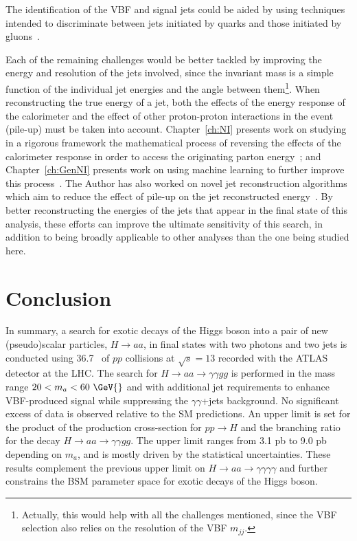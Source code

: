 The identification of the VBF and signal jets could be aided by using techniques intended to discriminate between jets initiated by quarks and those initiated by gluons~\cite{ATL-PHYS-PUB-2017-009,Aad:2014gea,ATLAS-CONF-2016-034,ATL-PHYS-PUB-2017-017}.

Each of the remaining challenges would be better tackled by improving the energy and \pt{} resolution of the jets involved, since the invariant mass is a simple function of the individual jet energies and the angle between them\footnote{Actually, this would help with all the challenges mentioned, since the VBF selection also relies on the resolution of the VBF $m_{jj}$.}.
When reconstructing the true energy of a jet, both the effects of the energy response of the calorimeter and the effect of other proton-proton interactions in the event (pile-up) must be taken into account.
Chapter~\ref{ch:NI} presents work on studying in a rigorous framework the mathematical process of reversing the effects of the calorimeter response in order to access the originating parton energy~\cite{Cukierman:2016dkb};
and Chapter~\ref{ch:GenNI} presents work on using machine learning to further improve this process~\cite{ATL-PHYS-PUB-2018-013}.
The Author has also worked on novel jet reconstruction algorithms which aim to reduce the effect of pile-up on the jet reconstructed energy~\cite{ATLAS-CONF-2017-065}.
By better reconstructing the energies of the jets that appear in the final state of this analysis, these efforts can improve the ultimate sensitivity of this search, in addition to being broadly applicable to other analyses than the one being studied here. 

\FloatBarrier
\section{Conclusion}
\label{sec:HBSM:conclusion}
In summary, a search for exotic decays of the Higgs boson into a pair of new (pseudo)scalar particles,
$H\to aa$, in final states with two photons 
and two jets is conducted using 36.7~\ifb{} of $pp$ collisions at $\sqrt{s}=13$ \TeV{} recorded 
with the ATLAS detector at the LHC. The search for $H\to aa \to \gamma\gamma gg$ is performed
in the mass range $20 < m_a < 60~\GeV{}$ and with additional jet requirements 
to enhance VBF-produced signal while suppressing the $\gamma\gamma$+jets background.
No significant excess of data is observed relative to the SM predictions. An upper limit
is set for the product of the production cross-section for $pp\to H$ and the branching
ratio for the decay $H\to aa\to\gamma\gamma gg$. The upper limit ranges from 3.1 pb to 9.0 pb depending
on $m_a$, and is mostly driven by the statistical uncertainties.
These results complement the previous upper limit on $H\to aa\to\gamma\gamma\gamma\gamma$ and
further constrains the BSM parameter space for exotic decays of the Higgs boson.

